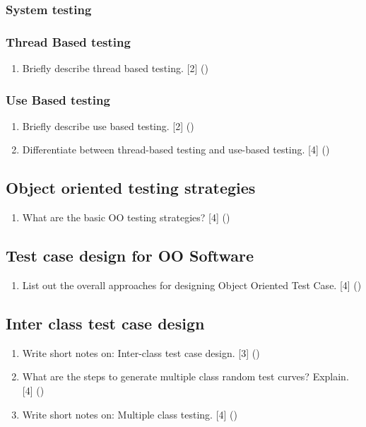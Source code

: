 \documentclass[12pt]{article}
\begin{document}
    \subsubsection{System testing}
    \subsubsection{Thread Based testing}
      \begin{enumerate}
        \item Briefly describe thread based testing. \hfill [2] ()
      \end{enumerate}

    \subsubsection{Use Based testing}
      \begin{enumerate}
        \item Briefly describe use based testing. \hfill [2] ()

        \item Differentiate between thread-based testing and use-based testing. \hfill [4] ()
      \end{enumerate}

  \subsection{Object oriented testing strategies}
    \begin{enumerate}
      \item What are the basic OO testing strategies? \hfill [4] ()
    \end{enumerate}

  \subsection{Test case design for OO Software}
    \begin{enumerate}
      \item List out the overall approaches for designing Object Oriented Test Case. \hfill [4] ()
    \end{enumerate}

  \subsection{Inter class test case design}
    \begin{enumerate}
      \item Write short notes on: Inter-class test case design. \hfill [3] ()
        
      \item What are the steps to generate multiple class random test curves? Explain. \hfill [4] ()

      \item Write short notes on: Multiple class testing. \hfill [4] ()
    \end{enumerate}
\end{document}
